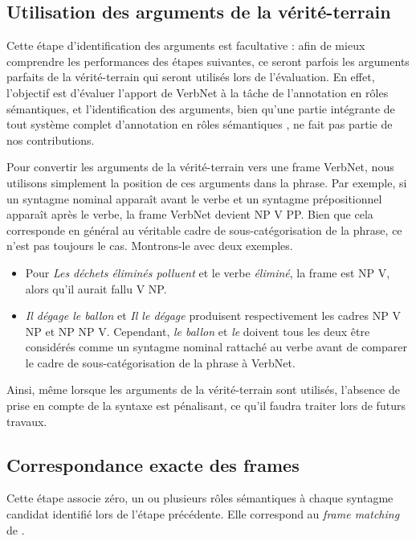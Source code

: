 \subsection{Utilisation des arguments de la vérité-terrain}

Cette étape d'identification des arguments est facultative : afin de mieux
comprendre les performances des étapes suivantes, ce seront parfois les
arguments parfaits de la vérité-terrain qui seront utilisés lors de
l'évaluation. En effet, l'objectif est d'évaluer l'apport de VerbNet à la tâche
de l'annotation en rôles sémantiques, et l'identification des arguments, bien
qu'une partie intégrante de tout système complet d'annotation en rôles
sémantiques \citep{das2010probabilistic}, ne fait pas partie de nos
contributions.

Pour convertir les arguments de la vérité-terrain vers une frame VerbNet, nous
utilisons simplement la position de ces arguments dans la phrase. Par exemple,
si un syntagme nominal apparaît avant le verbe et un syntagme prépositionnel
apparaît après le verbe, la frame VerbNet devient NP V PP. Bien que cela
corresponde en général au véritable cadre de sous-catégorisation de la phrase,
ce n'est pas toujours le cas. Montrons-le avec deux exemples.

\begin{itemize}
    \item Pour \textit{Les déchets éliminés polluent} et le verbe
        \textit{éliminé}, la frame est NP V, alors qu'il aurait fallu V NP.
    \item \textit{Il dégage le ballon} et \textit{Il le dégage} produisent
        respectivement les cadres NP V NP et NP NP V. Cependant, \textit{le
        ballon} et \textit{le} doivent tous les deux être considérés comme un
        syntagme nominal rattaché au verbe avant de comparer le cadre de
        sous-catégorisation de la phrase à VerbNet.
\end{itemize}

Ainsi, même lorsque les arguments de la vérité-terrain sont utilisés, l'absence
de prise en compte de la syntaxe est pénalisant, ce qu'il faudra traiter lors
de futurs travaux.

\subsection{Correspondance exacte des frames}
\label{correspondance_exacte}

Cette étape associe zéro, un ou plusieurs rôles sémantiques à chaque syntagme
candidat identifié lors de l'étape précédente. Elle correspond au \textit{frame
matching} de \citet{swier2005exploiting}.

